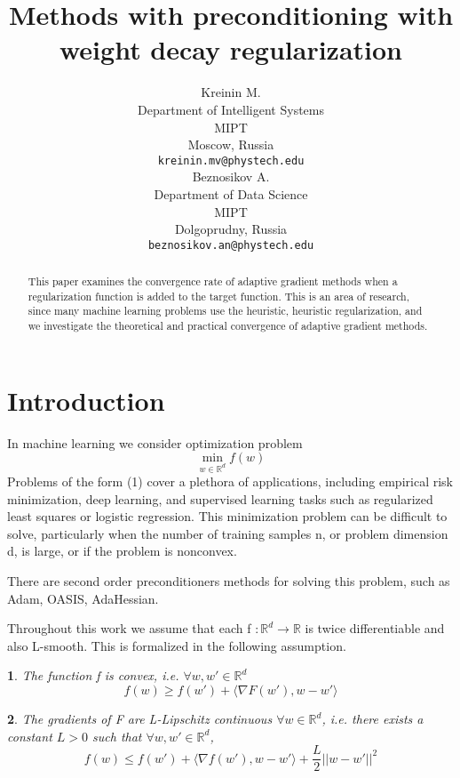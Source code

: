 \documentclass{article}
\title{Methods with preconditioning with weight decay regularization}
\author{ Kreinin M. \\
	Department of Intelligent Systems\\
	MIPT\\
	Moscow, Russia \\
	\texttt{kreinin.mv@phystech.edu} \\
	\And
	Beznosikov A. \\
	Department of Data Science\\
	MIPT\\
	Dolgoprudny, Russia \\
	\texttt{beznosikov.an@phystech.edu} \\
}
\date{}
\makeatletter
\newtheorem*{assumption*}{\assumptionnumber}
\providecommand{\assumptionnumber}{}
\newenvironment{assumption}[2]
 {%
  \renewcommand{\assumptionnumber}{\textbf{Assumption} #1 ({#2})}%
  \begin{assumption*}%
  \protected@edef\@currentlabel{#1-#2}%
 }
 {%
  \end{assumption*}
 }
\makeatother
\begin{document}
\maketitle

\begin{abstract}
	This paper examines the convergence rate of adaptive gradient methods when a regularization function is added to the target function. This is an area of research, since many machine learning problems use the heuristic, heuristic regularization, and we investigate the theoretical and practical convergence of adaptive gradient methods.
\end{abstract}


\section{Introduction}
In machine learning we consider optimization problem
\begin{equation*}
	\min_{w \in \mathbb{R}^d} f(w)
\end{equation*}
Problems of the form (1) cover a plethora of applications, including empirical risk minimization,
deep learning, and supervised learning tasks such as regularized least squares or logistic regression. This minimization problem can be difficult to solve, particularly when the number of training
samples n, or problem dimension d, is large, or if the problem is nonconvex.

There are second order preconditioners methods for solving this problem, such as Adam, OASIS, AdaHessian. 

Throughout this work we assume that each f $:\mathbb{R}^d \rightarrow \mathbb{R}$ is twice differentiable and also L-smooth. This is formalized in the following assumption.

\begin{assumption}{1}{Convex}
	The function f is convex, i.e. $\forall w, w' \in \mathbb{R}^d$
	\begin{equation}
		f(w) \geq f(w') + \langle \nabla F(w'), w-w' \rangle
	\end{equation}
\end{assumption}

\begin{assumption}{2}{L-smoothness}
	The gradients of F are L-Lipschitz continuous $\forall w \in \mathbb{R}^d$, i.e. there exists a constant $L > 0$ such that $\forall w, w' \in \mathbb{R}^d$,
	\begin{equation*}
		f(w) \leq f(w') + \langle \nabla f(w'), w-w' \rangle + \frac{L}{2} ||w - w'||^2
	\end{equation*}
\end{assumption}
\end{document}
